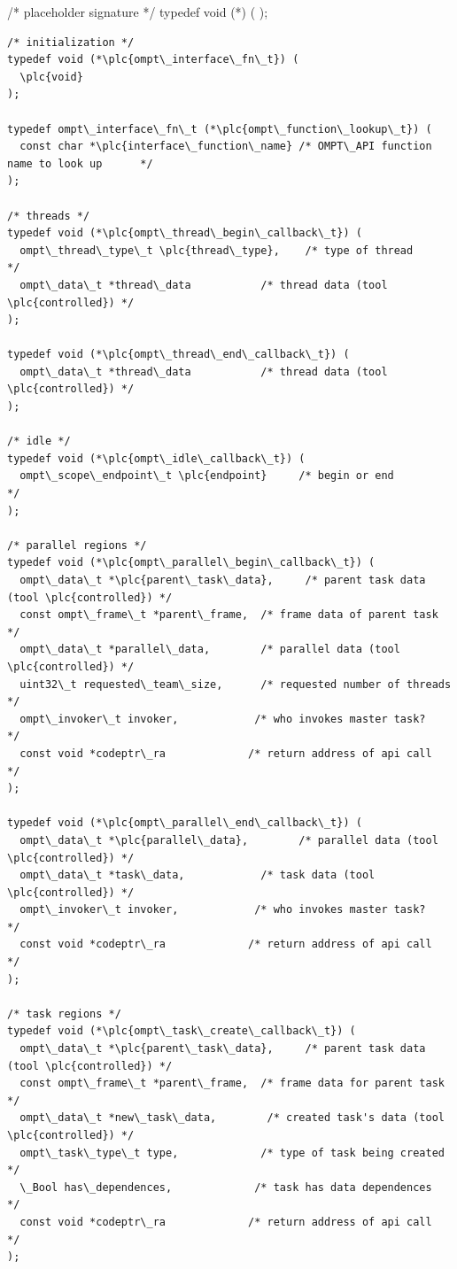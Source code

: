 \documentclass{article}
\begin{document}
\begin{boxedcode}
/* placeholder signature  */
typedef void (*) (    
);

\begin{verbatim}
/* initialization */
typedef void (*\plc{ompt\_interface\_fn\_t}) (
  \plc{void}
);

typedef ompt\_interface\_fn\_t (*\plc{ompt\_function\_lookup\_t}) (
  const char *\plc{interface\_function\_name} /* OMPT\_API function name to look up      */
);

/* threads */
typedef void (*\plc{ompt\_thread\_begin\_callback\_t}) (
  ompt\_thread\_type\_t \plc{thread\_type},    /* type of thread              */
  ompt\_data\_t *thread\_data           /* thread data (tool \plc{controlled}) */
);

typedef void (*\plc{ompt\_thread\_end\_callback\_t}) (
  ompt\_data\_t *thread\_data           /* thread data (tool \plc{controlled}) */
);

/* idle */
typedef void (*\plc{ompt\_idle\_callback\_t}) ( 
  ompt\_scope\_endpoint\_t \plc{endpoint}     /* begin or end                */
);

/* parallel regions */
typedef void (*\plc{ompt\_parallel\_begin\_callback\_t}) (
  ompt\_data\_t *\plc{parent\_task\_data},     /* parent task data (tool \plc{controlled}) */
  const ompt\_frame\_t *parent\_frame,  /* frame data of parent task   */
  ompt\_data\_t *parallel\_data,        /* parallel data (tool \plc{controlled}) */
  uint32\_t requested\_team\_size,      /* requested number of threads */
  ompt\_invoker\_t invoker,            /* who invokes master task?    */
  const void *codeptr\_ra             /* return address of api call  */ 
);

typedef void (*\plc{ompt\_parallel\_end\_callback\_t}) (
  ompt\_data\_t *\plc{parallel\_data},        /* parallel data (tool \plc{controlled}) */
  ompt\_data\_t *task\_data,            /* task data (tool \plc{controlled}) */
  ompt\_invoker\_t invoker,            /* who invokes master task?    */
  const void *codeptr\_ra             /* return address of api call  */ 
);

/* task regions */
typedef void (*\plc{ompt\_task\_create\_callback\_t}) ( 
  ompt\_data\_t *\plc{parent\_task\_data},     /* parent task data (tool \plc{controlled}) */
  const ompt\_frame\_t *parent\_frame,  /* frame data for parent task  */
  ompt\_data\_t *new\_task\_data,        /* created task's data (tool \plc{controlled}) */
  ompt\_task\_type\_t type,             /* type of task being created  */ 
  \_Bool has\_dependences,             /* task has data dependences   */
  const void *codeptr\_ra             /* return address of api call  */ 
);


\end{verbatim}
\end{boxedcode}
\end{document}
